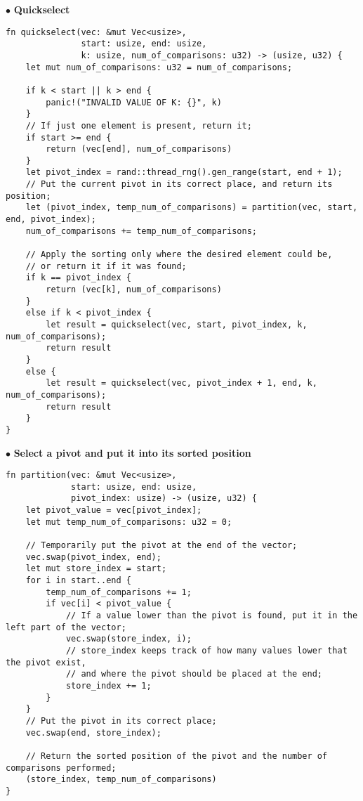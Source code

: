 \documentclass[
12pt,
a4paper,
oneside,
headinclude,
footinclude]{article}
\begin{document}
$\bullet$ \textbf{Quickselect}
\begin{verbatim}
fn quickselect(vec: &mut Vec<usize>,
               start: usize, end: usize,
               k: usize, num_of_comparisons: u32) -> (usize, u32) {
    let mut num_of_comparisons: u32 = num_of_comparisons;

    if k < start || k > end {
        panic!("INVALID VALUE OF K: {}", k)
    }
    // If just one element is present, return it;
    if start >= end {
        return (vec[end], num_of_comparisons)
    }
    let pivot_index = rand::thread_rng().gen_range(start, end + 1);
    // Put the current pivot in its correct place, and return its position;
    let (pivot_index, temp_num_of_comparisons) = partition(vec, start, end, pivot_index);
    num_of_comparisons += temp_num_of_comparisons;

    // Apply the sorting only where the desired element could be,
    // or return it if it was found;
    if k == pivot_index {
        return (vec[k], num_of_comparisons)
    }
    else if k < pivot_index {
        let result = quickselect(vec, start, pivot_index, k, num_of_comparisons);
        return result
    }
    else {
        let result = quickselect(vec, pivot_index + 1, end, k, num_of_comparisons);
        return result
    }
}
\end{verbatim}

$\bullet$ \textbf{Select a pivot and put it into its sorted position}
\begin{verbatim}
fn partition(vec: &mut Vec<usize>,
             start: usize, end: usize,
             pivot_index: usize) -> (usize, u32) {
    let pivot_value = vec[pivot_index];
    let mut temp_num_of_comparisons: u32 = 0;

    // Temporarily put the pivot at the end of the vector;
    vec.swap(pivot_index, end);
    let mut store_index = start;
    for i in start..end {
        temp_num_of_comparisons += 1;
        if vec[i] < pivot_value {
            // If a value lower than the pivot is found, put it in the left part of the vector;
            vec.swap(store_index, i);
            // store_index keeps track of how many values lower that the pivot exist,
            // and where the pivot should be placed at the end;
            store_index += 1;
        }
    }
    // Put the pivot in its correct place;
    vec.swap(end, store_index);

    // Return the sorted position of the pivot and the number of comparisons performed;
    (store_index, temp_num_of_comparisons)
}

\end{verbatim}
\end{document}
